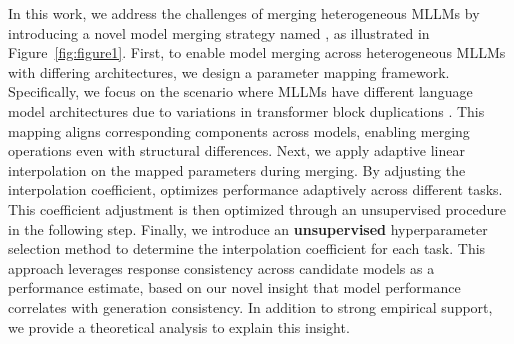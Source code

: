 In this work, we address the challenges of merging heterogeneous MLLMs by introducing a novel model merging strategy named \ours
, as illustrated in Figure~\ref{fig:figure1}.
First, to enable model merging across heterogeneous MLLMs with differing architectures, we design a parameter mapping framework. Specifically, we focus on the scenario where MLLMs have different language model architectures due to variations in transformer block duplications \cite{cogvlm, cogvlm2, mplugowl2}. This mapping aligns corresponding components across models, enabling merging operations even with structural differences. Next, we apply adaptive linear interpolation on the mapped parameters during merging. By adjusting the interpolation coefficient, \ours optimizes performance adaptively across different tasks. This coefficient adjustment is then optimized through an unsupervised procedure in the following step. Finally, we introduce an \textbf{unsupervised} hyperparameter selection method to determine the interpolation coefficient for each task. This approach leverages response consistency across candidate models as a performance estimate, based on our novel insight that model performance correlates with generation consistency. In addition to strong empirical support, we provide a theoretical analysis to explain this insight.


